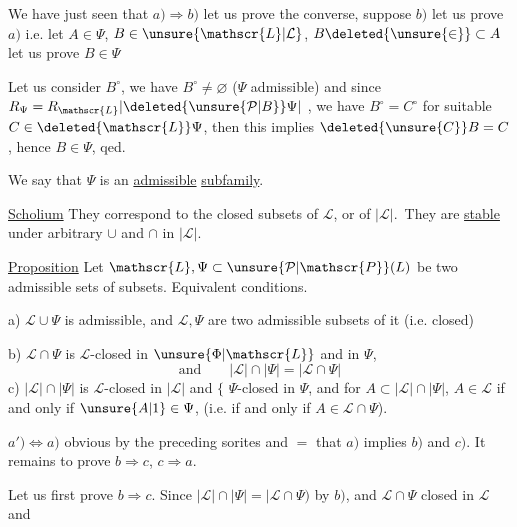 We have just seen that $a)\Rightarrow b)$ let us prove the converse, suppose $b)$ let us prove $a)$ i.e. let $A\in\Psi$, $B\in\unsure{\mathscr{L}|\mathcal{L}}$, $B\deleted{\unsure{\in}}\subset A$ let us prove $B\in\Psi$

Let us consider $B^\circ$, we have $B^\circ\ne\varnothing$ ($\Psi$ admissible) and since $R_\Psi=R_{\mathscr{L}}\lvert\deleted{\unsure{\mathcal{P}|B}}\Psi\rvert$ , we have $B^\circ=C^\circ$ for suitable $C\in\deleted{\mathscr{L}}\Psi$, then this implies $\deleted{\unsure{C}}B=C$, hence $B\in\Psi$, qed.

We say that $\Psi$ is an \uline{admissible} \uline{subfamily}.

\uline{Scholium} They correspond  to the closed subsets of $\mathscr{L}$, or of $|\mathscr{L}|$. \unsure{\ensuremath{\Rightarrow}|=}\,They are \uline{stable} under arbitrary $\cup$ and $\cap$ in $|\mathscr{L}|$.

\uline{Proposition} Let $\mathscr{L},\Psi\subset\unsure{\mathcal{P}|\mathscr{P}}(L)$ be two admissible sets of subsets. Equivalent conditions.

a) $\mathscr{L}\cup\Psi$ is admissible, and $\mathscr{L},\Psi$ are two admissible subsets of it (i.e. closed)

b) $\mathscr{L}\cap\Psi$ is $\mathscr{L}$-closed in $\unsure{\Phi|\mathscr{L}}$ and  in $\Psi$,
\[
 \text{and}\qquad |\mathscr{L}|\cap|\Psi|=|\mathscr{L}\cap\Psi|
\]
c) $|\mathscr{L}|\cap|\Psi|$ is $\mathscr{L}$-closed in $|\mathscr{L}|$ and \ensuremath{\{} $\Psi$-closed in $\Psi$, and   for $A\subset|\mathscr{L}|\cap|\Psi|$, $A\in\mathscr{L}$  if and only if $\unsure{A|1}\in\Psi$, (i.e. if and only if $A\in\mathscr{L}\cap\Psi$).


$a')\Leftrightarrow a)$ obvious by the preceding sorites and \ensuremath{=} that $a)$ implies $b)$ and $c)$. It remains to prove $b\Rightarrow c$, $c\Rightarrow a$.

Let us first prove $b\Rightarrow c$. Since $|\mathscr{L}|\cap|\Psi|=\lvert\mathscr{L}\cap\Psi)$ by $b)$, and $\mathscr{L}\cap\Psi$ closed in $\mathscr{L}$ and
